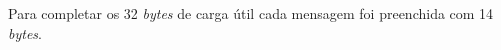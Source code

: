 Para completar os 32 \emph{bytes} de carga útil cada mensagem foi preenchida com 14 \emph{bytes}.


